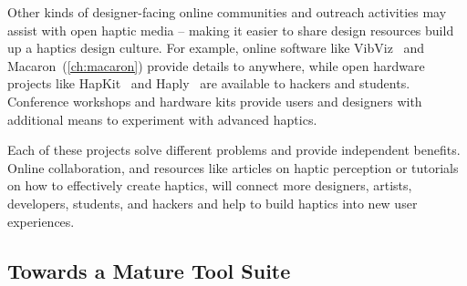     Other kinds of designer-facing online communities and outreach activities may assist with open haptic media -- making it easier to share design resources  build up a haptics design culture. %
%
    For example, online software like VibViz~\cite{Seifi2015} and Macaron~(\autoref{ch:macaron}) provide details to  anywhere, while open hardware projects like HapKit~\cite{Martinez2016} and Haply~\cite{Gallacher2016} are available to hackers and students.
    Conference workshops and hardware kits provide users and designers with additional means to experiment with advanced haptics.
    
    Each of these projects solve different problems and provide independent benefits.
    Online collaboration, and resources like articles on haptic perception or tutorials on how to effectively create haptics, will connect more designers, artists, developers, students, and hackers and help to build haptics into new user experiences.




%
%
\subsection{Towards a Mature \haxd Tool Suite}
\label{sec:conclusion:maturetoolsuite}

